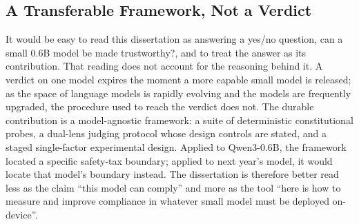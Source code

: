 \subsection{A Transferable Framework, Not a Verdict}
\label{subsec:transferable-framework}

It would be easy to read this dissertation as answering a yes/no question, can a small 0.6B model be made trustworthy?, and to treat the answer as its contribution. That reading does not account for the reasoning behind it. A verdict on one model expires the moment a more capable small model is released; as the space of language models is rapidly evolving and the models are frequently upgraded, the procedure used to reach the verdict does not. The durable contribution is a model-agnostic framework: a suite of deterministic constitutional probes, a dual-lens judging protocol whose design controls are stated, and a staged single-factor experimental design. Applied to Qwen3-0.6B, the framework located a specific safety-tax boundary; applied to next year's model, it would locate that model's boundary instead. The dissertation is therefore better read less as the claim ``this model can comply'' and more as the tool ``here is how to measure and improve compliance in whatever small model must be deployed on-device''.


%
